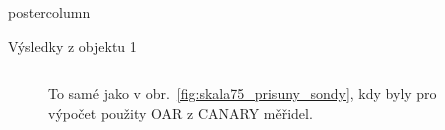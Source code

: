 \documentclass{beamer}
\begin{document}
\begin{frame}
\begin{columns}
\begin{column}{.57\textwidth}
\begin{beamercolorbox}[center]{postercolumn}
\begin{minipage}{.98\textwidth}
{\begin{myblock}{Výsledky z objektu 1}
\begin{columns}
\begin{column}{.45\textwidth}
\begin{figure}
        \caption{To samé jako v obr.~\ref{fig:skala75_prisuny_sondy}, kdy byly pro výpočet použity OAR z CANARY měřidel.}
    \end{figure}
\end{column}
\end{columns}

\end{myblock}\vfill


}
\end{minipage}
\end{beamercolorbox}
\end{column}
\end{columns}
\end{frame}
\end{document}
